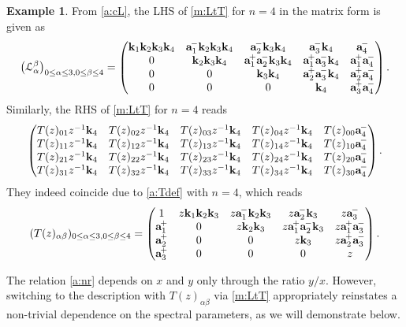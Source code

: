 \documentclass[11pt]{article}
\theoremstyle{definition}
\newtheorem{exam}[theo]{Example}
\numberwithin{equation}{section}
\newcommand{\am}{{\rm\aaa}^{\!-} }
\newcommand{\ap}{{\rm\aaa}^{\!+} }
\newcommand{\aaa}{\mathbf{a}}
\newcommand{\kk}{\mathbf{k}}
\begin{document}
\begin{exam}\label{a:ex:L}
From \eqref{a:cL}, the LHS of \eqref{m:LtT}  for $n=4$ in the matrix form is given as
\begin{equation}
\bigl(\mathcal{L}_\alpha^\beta\bigr)_{0 \le \alpha \le 3, 0 \le \beta \le 4}
=\begin{pmatrix}
 \kk_1 \kk_2 \kk_3 \kk_4 &  \am_1\kk_2\kk_3\kk_4 &  \am_2\kk_3\kk_4 &  \am_3\kk_4 &  \am_4
\\
0 &  \kk_2 \kk_3\kk_4 & \ap_1\am_2 \kk_3\kk_4 &  \ap_1 \am_3 \kk_4 & \ap_1 \am_4
\\
0 & 0 &  \kk_3 \kk_4 &  \ap_2\am_3 \kk_4 &  \ap_2\am_4 
\\
0 & 0 & 0 &  \kk_4 &  \ap_3\am_4
\end{pmatrix}.
\end{equation}
Similarly, the RHS of \eqref{m:LtT} for $n=4$ reads
\begin{align}
\begin{pmatrix}
T(z)_{01}z^{-1}\kk_4 & T(z)_{02}z^{-1}\kk_4 & T(z)_{03}z^{-1}\kk_4 & T(z)_{04}z^{-1}\kk_4 & T(z)_{00}\am_4
\\
T(z)_{11}z^{-1}\kk_4 & T(z)_{12}z^{-1}\kk_4 & T(z)_{13}z^{-1}\kk_4 & T(z)_{14}z^{-1}\kk_4 & T(z)_{10}\am_4
\\
T(z)_{21}z^{-1}\kk_4 & T(z)_{22}z^{-1}\kk_4 & T(z)_{23}z^{-1}\kk_4 & T(z)_{24}z^{-1}\kk_4 & T(z)_{20}\am_4
\\
T(z)_{31}z^{-1}\kk_4 & T(z)_{32}z^{-1}\kk_4 & T(z)_{33}z^{-1}\kk_4 & T(z)_{34}z^{-1}\kk_4 & T(z)_{30}\am_4
\end{pmatrix}.
\end{align}
They indeed coincide due to \eqref{a:Tdef} with $n=4$, which reads
\begin{align}\label{a:ex:t4}
(T(z)_{\alpha \beta})_{0 \le \alpha \le 3, 0 \le \beta \le 4}
=\begin{pmatrix}
1 & z \kk_1\kk_2 \kk_3 & z \am_1\kk_2 \kk_3 & z \am_2 \kk_3  & z\am_3
\\
\ap_1 & 0 & z \kk_2\kk_3 & z \ap_1 \am_2 \kk_3 & z \ap_1\am_3
\\
\ap_2 & 0 & 0 & z \kk_3 & z \ap_2\am_3
\\
\ap_3 & 0 & 0 & 0 & z
\end{pmatrix}.
\end{align} 
\end{exam}

The relation \eqref{a:nr} depends on \( x \) and \( y \) 
only through the ratio \( y/x \). 
However, switching to the description with \( T(z)_{\alpha \beta} \) 
via \eqref{m:LtT} appropriately reinstates a non-trivial dependence 
on the spectral parameters, as we will demonstrate below.
\end{document}
